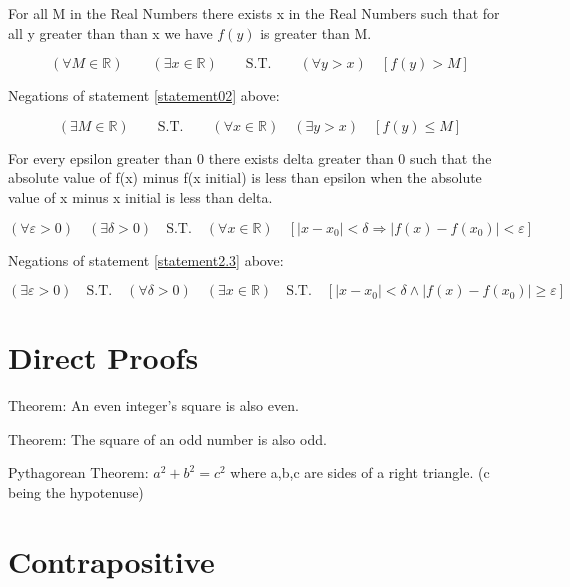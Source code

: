\vspace{10 mm}

For all M in the Real Numbers there exists x in the Real Numbers such that for all y greater than than x we have $f(y)$ is greater than M.

\begin{equation}
  (\forall M \in \mathbb{R})\qquad (\exists x \in \mathbb{R})\qquad \text{S.T.}\qquad (\forall y > x)\quad [f(y) > M]  
  \label{statement02}
\end{equation}

Negations of statement \ref{statement02} above:

\begin{equation*}
  (\exists M \in \mathbb{R})\qquad \text{S.T.}\qquad (\forall x \in \mathbb{R})\quad (\exists y > x)\quad [f(y) \leq M]
\end{equation*}

For every epsilon greater than 0 there exists delta greater than 0 such that the absolute value of f(x) minus f(x initial) is less than epsilon when the absolute value of x minus x initial is less than delta.

\begin{equation}
  (\forall \varepsilon > 0)\quad (\exists \delta > 0)\quad \text{S.T.} \quad (\forall x \in \mathbb{R})\quad [|x-x_{0}| < \delta \Longrightarrow |f(x)-f(x_{0})| < \varepsilon]
  \label{statement2.3}
\end{equation}

Negations of statement \ref{statement2.3} above:

\begin{equation*}
  (\exists \varepsilon > 0)\quad \text{S.T.}\quad (\forall \delta >0)\quad (\exists x \in \mathbb{R})\quad \text{S.T.}\quad [|x-x_{0}| < \delta \wedge |f(x)-f(x_{0})| \geq \varepsilon]
\end{equation*}

\section{Direct Proofs}

Theorem: An even integer's square is also even.

Theorem: The square of an odd number is also odd.

Pythagorean Theorem: $a^{2}+b^{2}=c^{2}$ where a,b,c are sides of a right triangle. (c being the hypotenuse)

\section{Contrapositive}

